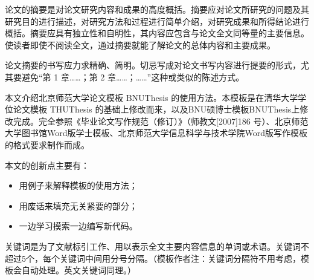 


\makeatother




\begin{cabstract}
论文的摘要是对论文研究内容和成果的高度概括。摘要应对论文所研究的问题及其研究目的进行描述，对研究方法和过程进行简单介绍，对研究成果和所得结论进行概括。摘要应具有独立性和自明性，其内容应包含与论文全文同等量的主要信息。使读者即使不阅读全文，通过摘要就能了解论文的总体内容和主要成果。

论文摘要的书写应力求精确、简明。切忌写成对论文书写内容进行提要的形式，尤其要避免“第 1 章……；第 2 章……；……”这种或类似的陈述方式。

本文介绍北京师范大学论文模板 BNUThesis 的使用方法。本模板是在清华大学学位论文模板 THUThesis 的基础上修改而来，以及BNU硕博士模板BNUThesis上修改完成。完全参照《毕业论文写作规范（修订）》（师教文[2007]186 号）、北京师范大学图书馆Word版学士模板、北京师范大学信息科学与技术学院Word版写作模板的格式要求制作而成。

  本文的创新点主要有：
  \begin{itemize}[$\bullet$]
    \item 用例子来解释模板的使用方法；
    \item 用废话来填充无关紧要的部分；
    \item 一边学习摸索一边编写新代码。
  \end{itemize}

  关键词是为了文献标引工作、用以表示全文主要内容信息的单词或术语。关键词不超过5个，每个关键词中间用分号分隔。（模板作者注：关键词分隔符不用考虑，模板会自动处理。英文关键词同理。）
\end{cabstract}



